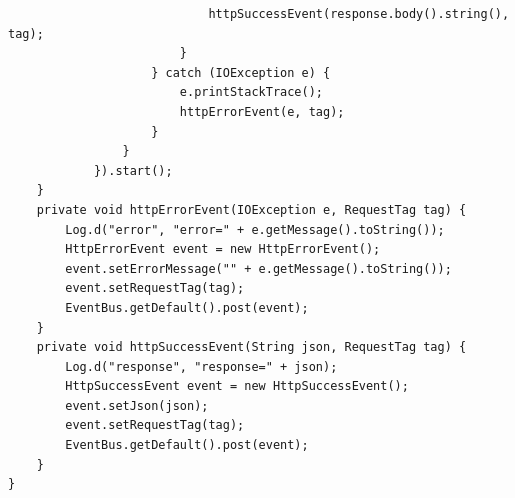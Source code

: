 \documentclass[9pt, b5paper]{article}
\begin{document}
\begin{verbatim}
                            httpSuccessEvent(response.body().string(), tag);
                        }
                    } catch (IOException e) {
                        e.printStackTrace();
                        httpErrorEvent(e, tag);
                    }
                }
            }).start();
    }
    private void httpErrorEvent(IOException e, RequestTag tag) {
        Log.d("error", "error=" + e.getMessage().toString());
        HttpErrorEvent event = new HttpErrorEvent();
        event.setErrorMessage("" + e.getMessage().toString());
        event.setRequestTag(tag);
        EventBus.getDefault().post(event);
    }
    private void httpSuccessEvent(String json, RequestTag tag) {
        Log.d("response", "response=" + json);
        HttpSuccessEvent event = new HttpSuccessEvent();
        event.setJson(json);
        event.setRequestTag(tag);
        EventBus.getDefault().post(event);
    }
}
\end{verbatim}
\end{document}
